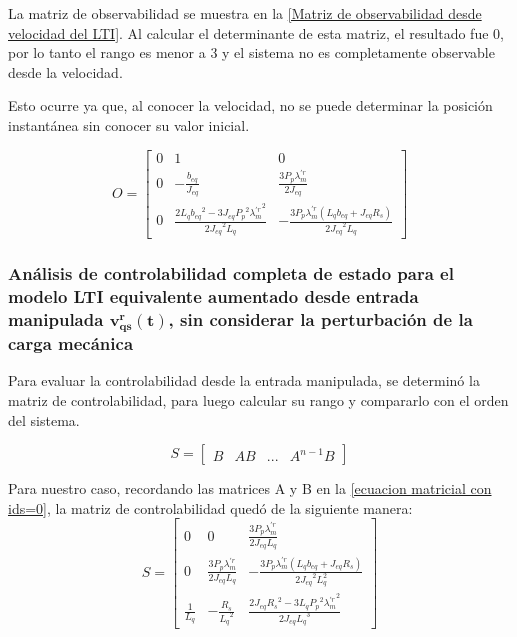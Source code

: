 \documentclass[a4paper, 10pt, onecolumn,journal]{ieeeconf}
\begin{document}
La matriz de observabilidad se muestra en la \cref{Matriz de observabilidad desde velocidad del LTI}.
Al calcular el determinante de esta matriz, el resultado fue 0, por lo tanto el rango es menor a 3 y el sistema no es completamente observable desde la velocidad.

Esto ocurre ya que, al conocer la velocidad, no se puede determinar la posición instantánea sin conocer su valor inicial.

\begin{equation}
	O=
	\begin{bmatrix}
		0 & 1 & 0 \\ 
		0 & -\frac{b_{eq}}{J_{eq}} &\frac{3 P_p \lambda^{'r}_m}{2 J_{eq}}\\
		0 & \frac{2 L_q {b_{eq}}^2 - 3 J_{eq} {P_p}^2 {\lambda^{'r}_m}^2} {2 {J_{eq}}^2 L_q} & -\frac{3 P_p \lambda^{'r}_m \left(L_q b_{eq} + J_{eq} R_s \right)}{2 {J_{eq}}^2 L_q}  
	\end{bmatrix}
	\label{Matriz de observabilidad desde velocidad del LTI}
\end{equation}

\subsubsection{\textbf{Análisis de controlabilidad completa de estado para el modelo LTI equivalente aumentado desde entrada manipulada $\mathbf{v^r_{qs}(t)}$, sin considerar la perturbación de la carga mecánica}}
Para evaluar la controlabilidad desde la entrada manipulada, se determinó la matriz de controlabilidad, para luego calcular su rango y compararlo con el orden del sistema.

\begin{equation}
	S=
	\begin{bmatrix}
		B & AB & ... & A^{n-1}B  
	\end{bmatrix}
	\label{Matriz de controlabilidad generica}
\end{equation}

Para nuestro caso, recordando las matrices A y B en la \cref{ecuacion matricial con ids=0}, la matriz de controlabilidad quedó de la siguiente manera:
\begin{equation}
	S=
	\begin{bmatrix}
		0 & 0 & \frac{3 P_p \lambda^{'r}_m}{2 J_{eq} L_q}\\ 
		0 & \frac{3 P_p \lambda^{'r}_m}{2 J_{eq} L_q} & -\frac{3 P_p \lambda^{'r}_m \left(L_q b_{eq} + J_{eq} R_s \right)}{2 {J_{eq}}^2 L_q^2}\\
		\frac{1}{L_q} & -\frac{R_s}{{L_q}^2} & \frac{2 J_{eq} {R_s}^2 - 3 L_{q} {P_p}^2 {\lambda^{'r}_m}^2} {2 J_{eq} {L_q}^3}  
	\end{bmatrix}
	\label{Matriz de controlabilidad del LTI}
\end{equation}
\end{document}
